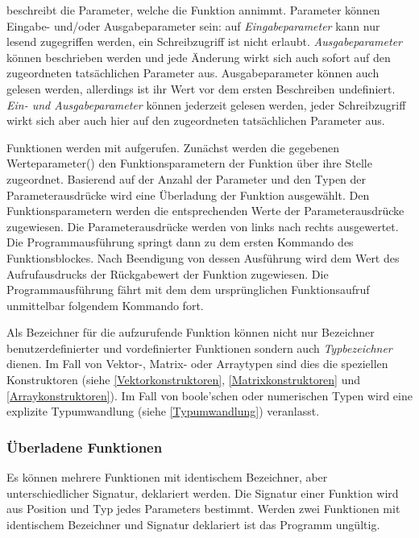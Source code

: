  beschreibt die Parameter, welche die Funktion annimmt.
Parameter können Eingabe- und/oder Ausgabeparameter sein: auf \emph{Eingabeparameter} kann
nur lesend zugegriffen werden, ein Schreibzugriff ist nicht erlaubt.
\emph{Ausgabeparameter} können beschrieben werden und jede Änderung wirkt sich auch sofort auf
den zugeordneten tatsächlichen Parameter aus. Ausgabeparameter können auch gelesen werden,
allerdings ist ihr Wert vor dem ersten Beschreiben undefiniert.
\emph{Ein- und Ausgabeparameter} können jederzeit gelesen werden, jeder Schreibzugriff wirkt sich
aber auch hier auf den zugeordneten tatsächlichen Parameter aus.

Funktionen werden mit  aufgerufen. Zunächst werden die
gegebenen Werteparameter() den Funktionsparametern der Funktion über ihre Stelle zugeordnet.
Basierend auf der Anzahl der Parameter und den Typen der Parameterausdrücke wird eine Überladung der Funktion ausgewählt.
Den Funktionsparametern werden die entsprechenden Werte der Parameterausdrücke zugewiesen.
Die Parameterausdrücke werden von links nach rechts ausgewertet.
Die Programmausführung springt dann zu dem ersten
Kommando des Funktionsblockes. Nach Beendigung von dessen Ausführung wird dem Wert des Aufrufausdrucks der
Rückgabewert der Funktion zugewiesen. Die Programmausführung fährt mit dem dem ursprünglichen Funktionsaufruf
unmittelbar folgendem Kommando fort.

Als Bezeichner für die aufzurufende Funktion können nicht nur Bezeichner benutzerdefinierter und
vordefinierter Funktionen sondern auch \emph{Typbezeichner} dienen.
Im Fall von Vektor-, Matrix- oder Arraytypen sind dies die speziellen Konstruktoren
(siehe \ref{Vektorkonstruktoren}, \ref{Matrixkonstruktoren} und \ref{Arraykonstruktoren}).
Im Fall von boole'schen oder numerischen Typen wird eine explizite Typumwandlung (siehe
\ref{Typumwandlung}) veranlasst.


\subsubsection{Überladene Funktionen}\label{Ueberladene Funktionen}

Es können mehrere Funktionen mit identischem Bezeichner, aber unterschiedlicher Signatur,
deklariert werden. Die Signatur einer Funktion wird aus Position und Typ jedes Parameters
bestimmt. Werden zwei Funktionen mit identischem Bezeichner und Signatur deklariert ist
das Programm ungültig.


